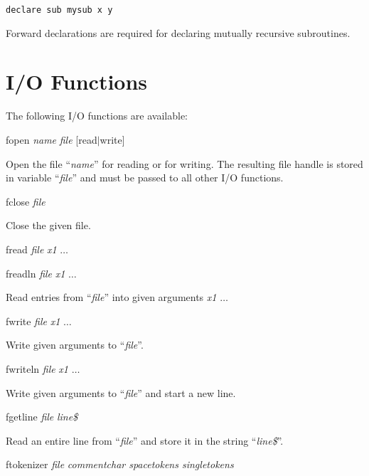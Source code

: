 \preglecode{}
\begin{Verbatim}
declare sub mysub x y
\end{Verbatim}
\postglecode{}

\noindent{}Forward declarations are required for declaring mutually recursive subroutines.

\section{I/O Functions}
  
  
 

The following I/O functions are available:

\begin{commanddescription}
\item[{\sf fopen {\it name} {\it file} [read$|$write]}]

Open the file ``{\it name}'' for reading or for writing. The resulting file handle is stored in variable ``{\it file}'' and must be passed to all other I/O functions.

\item[{\sf fclose {\it file}}]

Close the given file.

\item[{\sf fread {\it file} {\it x1} $\ldots$}]
\item[{\sf freadln {\it file} {\it x1} $\ldots$}]

Read entries from ``{\it file}'' into given arguments {\it x1} $\ldots$

\item[{\sf fwrite {\it file} {\it x1} $\ldots$}]

Write given arguments to ``{\it file}''.

\item[{\sf fwriteln {\it file} {\it x1} $\ldots$}]

Write given arguments to ``{\it file}'' and start a new line.

\item[{\sf fgetline {\it file} {\it line\$}}]

Read an entire line from ``{\it file}'' and store it in the string ``{\it line\$}''.

\item[{\sf ftokenizer {\it file} {\it commentchar spacetokens singletokens}}]


\end{commanddescription}
